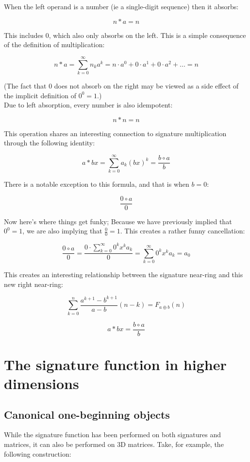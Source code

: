 \documentclass{article}
\begin{document}
\noindent When the left operand is a number (ie a single-digit sequence) then it absorbs:

$$n * a = n$$

\noindent This includes $0$, which also only absorbs on the left. This is a simple consequence of the definition of multiplication:

$$ n * a = \sum_{k=0}^{\infty} n_k a^k = n \cdot a^0 + 0 \cdot a^1 + 0 \cdot a^2 + ... = n$$

\noindent (The fact that 0 does not absorb on the right may be viewed as a side effect of the implicit definition of $0^0 = 1$.)\\

\noindent Due to left absorption, every number is also idempotent:

$$ n * n = n$$

\noindent This operation shares an interesting connection to signature multiplication through the following identity:

$$a * bx = \sum_{k=0}^{\infty} a_k (bx)^k = \frac{b \circ a}{b}$$

\noindent There is a notable exception to this formula, and that is when $b = 0$:

$$\frac{0 \circ a}{0}$$

\noindent Now here's where things get funky; Because we have previously implied that $0^0 = 1$, we are also implying that $\frac{0}{0} = 1$. This creates a rather funny cancellation:

$$\frac{0 \circ a}{0} = \frac{0 \cdot \sum_{k=0}^{\infty}  0^k x^k a_k}{0} = \sum_{k=0}^{\infty} 0^k x^k a_k = a_0$$

\noindent This creates an interesting relationship between the signature near-ring and this new right near-ring:

$$\sum_{k=0}^{n}{\frac{a^{k+1} - b^{k+1}}{a-b}}(n-k) = F_{a \oplus b}(n)$$

$$a * bx = \frac{b \circ a}{b}$$

\section{The signature function in higher dimensions}

\subsection{Canonical one-beginning objects}

\noindent While the signature function has been performed on both signatures and matrices, it can also be performed on 3D matrices. Take, for example, the following construction:
\end{document}
